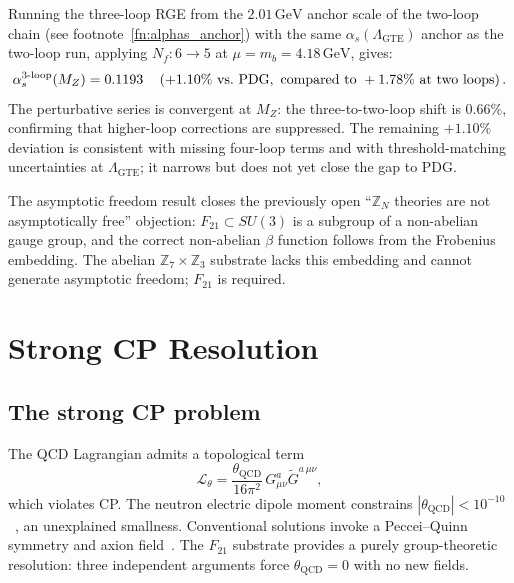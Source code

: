 \documentclass[11pt]{article}
\theoremstyle{remark}
\newcommand{\GTE}{\text{GTE}}
\newcommand{\QCD}{\text{QCD}}
\newcommand{\ZS}{\mathbb{Z}_7}
\newcommand{\ZZ}{\mathbb{Z}}
\newcommand{\Ftwentyone}{F_{21}}
\begin{document}
Running the three-loop RGE from the $2.01\,\mathrm{GeV}$ anchor scale of the
two-loop chain (see footnote~\ref{fn:alphas_anchor}) with
the same $\alpha_s(\Lambda_{\GTE})$ anchor as the two-loop run, applying
$N_f: 6 \to 5$ at $\mu = m_b = 4.18\,\mathrm{GeV}$, gives:
\begin{equation}
  \alpha_s^{\rm 3\text{-}loop}(M_Z) = 0.1193
  \quad
  \left(+1.10\%\ \text{vs.\ PDG},\ \text{compared to}\ +1.78\%\ \text{at two loops}\right).
  \label{eq:alphas3loop}
\end{equation}
The perturbative series is convergent at $M_Z$: the three-to-two-loop shift
is $0.66\%$, confirming that higher-loop corrections are suppressed.
The remaining $+1.10\%$ deviation is consistent with missing four-loop terms
and with threshold-matching uncertainties at $\Lambda_{\GTE}$; it narrows
but does not yet close the gap to PDG.

The asymptotic freedom result closes the previously open ``$\ZZ_N$ theories are
not asymptotically free'' objection: $\Ftwentyone \subset SU(3)$ is a subgroup
of a non-abelian gauge group, and the correct non-abelian $\beta$ function
follows from the Frobenius embedding.
The abelian $\ZS \times \ZZ_3$ substrate lacks this embedding and cannot
generate asymptotic freedom; $\Ftwentyone$ is required.

\section{Strong CP Resolution}
\label{sec:strongcp}

\subsection{The strong CP problem}
\label{ssec:cpstatement}

The QCD Lagrangian admits a topological term
\begin{equation}
  \mathcal{L}_\theta = \frac{\theta_{\QCD}}{16\pi^2}\,
    G^{a}_{\mu\nu}\tilde{G}^{a\,\mu\nu},
  \label{eq:thetaterm}
\end{equation}
which violates CP.
The neutron electric dipole moment constrains
$|\theta_{\QCD}| < 10^{-10}$~\cite{PDG2022},
an unexplained smallness.
Conventional solutions invoke a Peccei--Quinn symmetry and axion field~\cite{PecceiQuinn1977}.
The $\Ftwentyone$ substrate provides a purely group-theoretic resolution:
three independent arguments force $\theta_{\QCD} = 0$ with no new fields.
\end{document}
